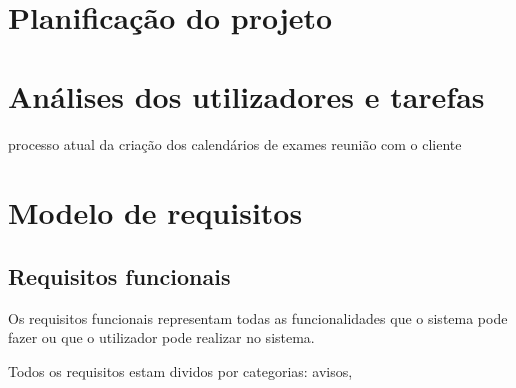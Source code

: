 \documentclass[11pt, twoside]{report}
\begin{document}
	\chapter{Planificação do projeto}

 	

	\chapter{Análises dos utilizadores e tarefas}
	processo atual da criação dos calendários de exames
	reunião com o cliente
	
	\chapter{Modelo de requisitos}
	\section{Requisitos funcionais}
	
	Os requisitos funcionais representam todas as funcionalidades que o sistema pode fazer ou que o utilizador pode realizar no sistema. 
	
	Todos os requisitos estam dividos por categorias: avisos, 
	
	
\end{document}
